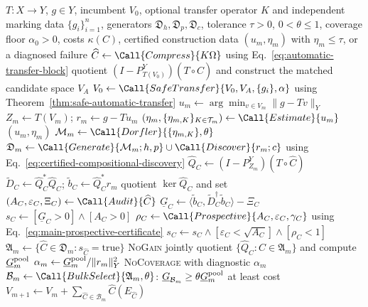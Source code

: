 \documentclass[11pt]{article}
\numberwithin{algorithm}{section}
\theoremstyle{definition}\newtheorem{definition}[theorem]{Definition}
\theoremstyle{remark}\newtheorem{remark}[theorem]{Remark}
\begin{document}
\begin{algorithm}[H]
\caption{Safe Schur--Riesz transfer and adaptive refinement}\label{alg:hpc}
\begin{algorithmic}[1]
\Require $T:X\to Y$, $g\in Y$, incumbent $V_0$, optional transfer operator
$K$ and independent marking data $\{g_i\}_{i=1}^n$, generators
$\mathfrak D_h,\mathfrak D_p,\mathfrak D_c$, tolerance $\tau>0$,
$0<\theta\leq1$, coverage floor $\alpha_0>0$, costs $\kappa(C)$,
certified construction data
\Ensure $(u_m,\eta_m)$ with $\eta_m\leq\tau$, or a diagnosed failure
  \State $\widehat C\gets\Call{Compress}{K\Omega}$ using
    Eq.~\eqref{eq:automatic-transfer-block}
  \State quotient $(I-P_{T(V_0)}^Y)(T\circ\widehat C)$ and construct
    the matched candidate space $V_A$
  \State $V_0\gets\Call{SafeTransfer}{V_0,V_A,\{g_i\},\alpha}$ using
    Theorem~\ref{thm:safe-automatic-transfer}
\EndIf
{}
  \State $u_m\gets\arg\min_{v\in V_m}\|g-Tv\|_Y$
  \State $Z_m\gets T(V_m)$; $r_m\gets g-Tu_m$
  \State $(\eta_m,\{\eta_{m,K}\}_{K\in\mathcal T_m})
     \gets\Call{Estimate}{u_m}$
    \State \Return $(u_m,\eta_m)$
  \EndIf
  \State $\mathcal M_m\gets\Call{Dorfler}
     {\{\eta_{m,K}\},\theta}$
  \State $\mathfrak D_m\gets\Call{Generate}{\mathcal M_m;h,p}
  \cup\Call{Discover}{r_m;c}$ using Eq.~\eqref{eq:certified-compositional-discovery}
    \State $\widehat Q_C\gets(I-P_{Z_m}^{Y})(T\circ\widehat C)$
    \State $\widetilde D_C\gets\widehat Q_C^*\widehat Q_C$;
      $\widetilde b_C\gets\widehat Q_C^*r_m$
    \State quotient $\ker\widehat Q_C$ and set
      $(A_C,\varepsilon_C,\Xi_C)\gets\Call{Audit}{\widehat C}$
    \State $\underline G_C\gets
      \langle\widetilde b_C,\widetilde D_C^\dagger
      \widetilde b_C\rangle-\Xi_C$
    \State $s_C\gets[\underline G_C>0]\wedge[A_C>0]$
      \State $\rho_C\gets\Call{Prospective}
        {A_C,\varepsilon_C,\gamma_C}$ using Eq.~\eqref{eq:main-prospective-certificate}
      \State $s_C\gets s_C\wedge
        [\varepsilon_C<\sqrt{A_C}]\wedge[\rho_C<1]$
    \EndIf
  \EndFor
  \State $\mathfrak A_m\gets
    \{\widehat C\in\mathfrak D_m:s_{\widehat C}=\mathrm{true}\}$
    \State \Return \textsc{NoGain}
  \EndIf
  \State jointly quotient $\{\widehat Q_C:C\in\mathfrak A_m\}$ and
    compute $\underline G_m^{\rm pool}$
  \State $\alpha_m\gets\underline G_m^{\rm pool}/\|r_m\|_Y^2$
    \State \Return \textsc{NoCoverage} with diagnostic $\alpha_m$
  \EndIf
  \State $\mathcal B_m\gets\Call{BulkSelect}{\mathfrak A_m,\theta}$:
    $\underline G_{\mathcal B_m}\geq
    \theta\underline G_m^{\rm pool}$ at least cost
  \State $V_{m+1}\gets V_m+
    \sum_{\widehat C\in\mathcal B_m}\widehat C(E_{\widehat C})$
\EndFor
\end{algorithmic}
\end{algorithm}
\end{document}

